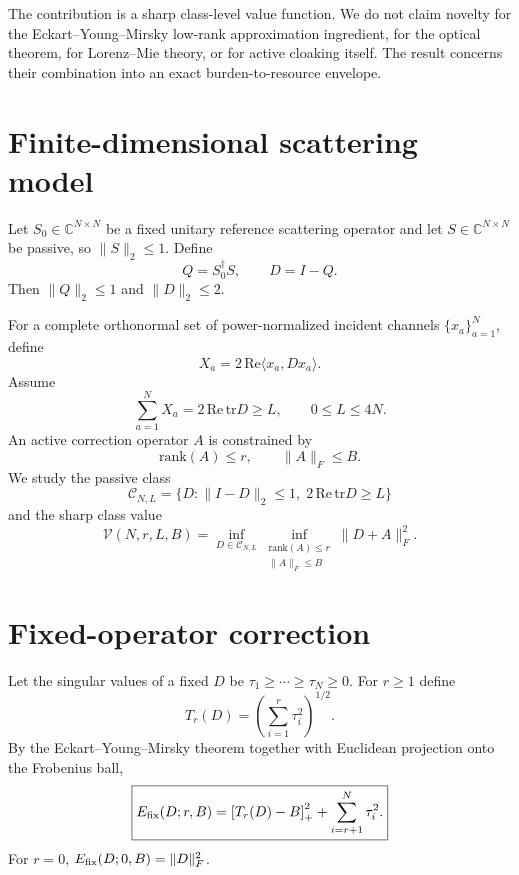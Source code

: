 \documentclass[aps,pra,onecolumn,superscriptaddress,nofootinbib]{revtex4-2}
\begin{document}
The contribution is a sharp class-level value function. We do not claim novelty for the Eckart--Young--Mirsky low-rank approximation ingredient, for the optical theorem, for Lorenz--Mie theory, or for active cloaking itself. The result concerns their combination into an exact burden-to-resource envelope.

\section{Finite-dimensional scattering model}
Let $S_0\in\mathbb C^{N\times N}$ be a fixed unitary reference scattering operator and let $S\in\mathbb C^{N\times N}$ be passive, so $\|S\|_2\le1$. Define
\begin{equation}
Q=S_0^\dagger S,\qquad D=I-Q.
\end{equation}
Then $\|Q\|_2\le1$ and $\|D\|_2\le2$.

For a complete orthonormal set of power-normalized incident channels $\{x_a\}_{a=1}^N$, define
\begin{equation}
X_a=2\,\mathrm{Re}\langle x_a,Dx_a\rangle.
\end{equation}
Assume
\begin{equation}
\sum_{a=1}^N X_a=2\,\mathrm{Re}\,\mathrm{tr}D\ge L,
\qquad 0\le L\le4N.
\end{equation}
An active correction operator $A$ is constrained by
\begin{equation}
\mathrm{rank}(A)\le r,\qquad \|A\|_F\le B.
\end{equation}
We study the passive class
\begin{equation}
\mathcal C_{N,L}=\{D:\|I-D\|_2\le1,\;2\,\mathrm{Re}\,\mathrm{tr}D\ge L\}
\end{equation}
and the sharp class value
\begin{equation}
\mathcal V(N,r,L,B)=\inf_{D\in\mathcal C_{N,L}}\inf_{\substack{\mathrm{rank}(A)\le r\\\|A\|_F\le B}}\|D+A\|_F^2.
\end{equation}

\section{Fixed-operator correction}
Let the singular values of a fixed $D$ be $\tau_1\ge\cdots\ge\tau_N\ge0$. For $r\ge1$ define
\begin{equation}
T_r(D)=\left(\sum_{i=1}^r\tau_i^2\right)^{1/2}.
\end{equation}
By the Eckart--Young--Mirsky theorem together with Euclidean projection onto the Frobenius ball,
\begin{equation}
\boxed{E_{\rm fix}(D;r,B)=\left[T_r(D)-B\right]_+^2+\sum_{i=r+1}^N\tau_i^2.}
\end{equation}
For $r=0$, $E_{\rm fix}(D;0,B)=\|D\|_F^2$.
\end{document}
